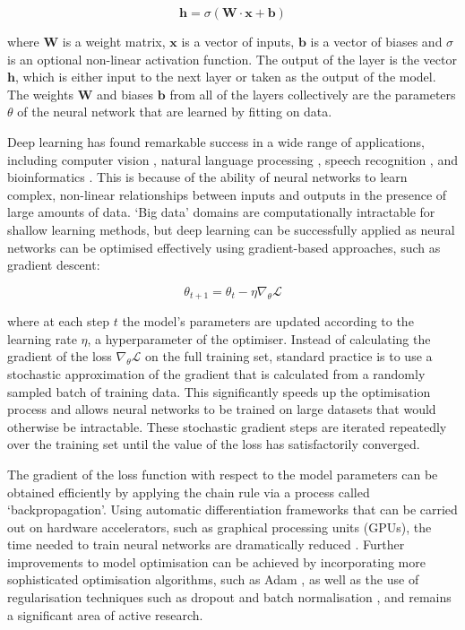 \begin{equation}
 \textbf{h} = \sigma(\mathbf{W} \cdot \mathbf{x} + \mathbf{b})
\end{equation}

where $\mathbf{W}$ is a weight matrix, $\mathbf{x}$ is a vector of inputs, $\mathbf{b}$ is a vector of biases and $\sigma$ is an optional non-linear activation function. The output of the layer is the vector $\mathbf{h}$, which is either input to the next layer or taken as the output of the model. The weights $\mathbf{W}$ and biases $\mathbf{b}$ from all of the layers collectively are the parameters $\theta$ of the neural network that are learned by fitting on data.

Deep learning has found remarkable success in a wide range of applications, including computer vision \cite{Wang2020CLIP}, natural language processing \cite{OpenAI2021GPT3}, speech recognition \cite{Schneider2019wav2vec}, and bioinformatics \cite{Jumper2021AlphaFold, Sapoval2022Bioinformatics}. This is because of the ability of neural networks to learn complex, non-linear relationships between inputs and outputs in the presence of large amounts of data. `Big data' domains are computationally intractable for shallow learning methods, but deep learning can be successfully applied as neural networks can be optimised effectively using gradient-based approaches, such as gradient descent:

\begin{equation}
 \theta_{t+1} = \theta_t - \eta \nabla_{\theta} \mathcal{L}
\end{equation}

where at each step $t$ the model's parameters are updated according to the learning rate $\eta$, a hyperparameter of the optimiser. Instead of calculating the gradient of the loss $\nabla_{\theta}\mathcal{L}$ on the full training set, standard practice is to use a stochastic approximation of the gradient that is calculated from a randomly sampled batch of training data. This significantly speeds up the optimisation process and allows neural networks to be trained on large datasets that would otherwise be intractable. These stochastic gradient steps are iterated repeatedly over the training set until the value of the loss has satisfactorily converged. 

The gradient of the loss function with respect to the model parameters can be obtained efficiently by applying the chain rule via a process called `backpropagation'. Using automatic differentiation frameworks that can be carried out on hardware accelerators, such as graphical processing units (GPUs), the time needed to train neural networks are dramatically reduced \cite{Baydin2018autodiff}. Further improvements to model optimisation can be achieved by incorporating more sophisticated optimisation algorithms, such as Adam \cite{Kingma2014Adam}, as well as the use of regularisation techniques such as dropout \cite{Srivastava2014dropout} and batch normalisation \cite{Ioffe2015batchnorm}, and remains a significant area of active research.

